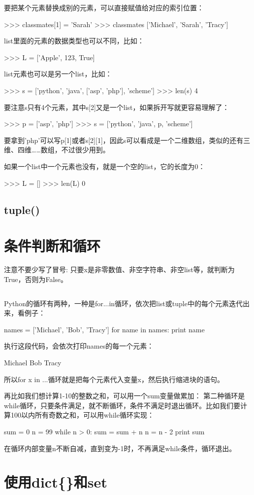 要把某个元素替换成别的元素，可以直接赋值给对应的索引位置：

>>> classmates[1] = 'Sarah'
>>> classmates
['Michael', 'Sarah', 'Tracy']

list里面的元素的数据类型也可以不同，比如：

>>> L = ['Apple', 123, True]

list元素也可以是另一个list，比如：

>>> s = ['python', 'java', ['asp', 'php'], 'scheme']
>>> len(s)
4

要注意s只有4个元素，其中s[2]又是一个list，如果拆开写就更容易理解了：

>>> p = ['asp', 'php']
>>> s = ['python', 'java', p, 'scheme']

要拿到'php'可以写p[1]或者s[2][1]，因此s可以看成是一个二维数组，类似的还有三维、四维……数组，不过很少用到。

如果一个list中一个元素也没有，就是一个空的list，它的长度为0：

>>> L = []
>>> len(L)
0
\section{tuple()}
\chapter{条件判断和循环}
注意不要少写了冒号:
只要x是非零数值、非空字符串、非空list等，就判断为True，否则为False。
\section{}
Python的循环有两种，一种是for...in循环，依次把list或tuple中的每个元素迭代出来，看例子：

names = ['Michael', 'Bob', 'Tracy']
for name in names:
    print name

执行这段代码，会依次打印names的每一个元素：

Michael
Bob
Tracy

所以for x in ...循环就是把每个元素代入变量x，然后执行缩进块的语句。

再比如我们想计算1-10的整数之和，可以用一个sum变量做累加：
第二种循环是while循环，只要条件满足，就不断循环，条件不满足时退出循环。比如我们要计算100以内所有奇数之和，可以用while循环实现：

sum = 0
n = 99
while n > 0:
    sum = sum + n
    n = n - 2
print sum

在循环内部变量n不断自减，直到变为-1时，不再满足while条件，循环退出。
\chapter{使用dict\{\}和set}

